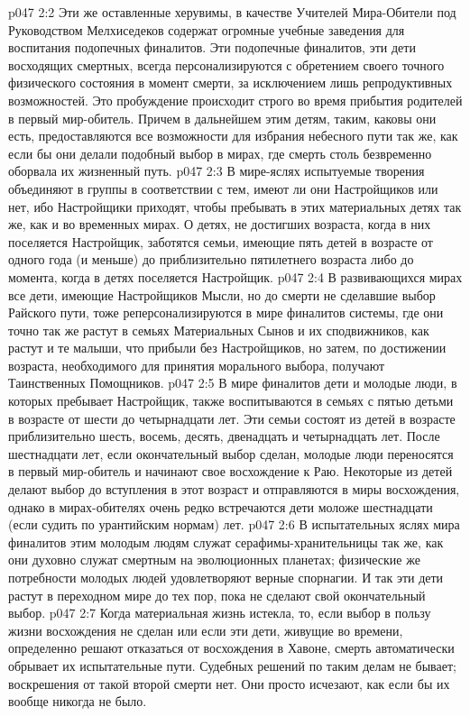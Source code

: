 \vs p047 2:2 Эти же оставленные херувимы, в качестве Учителей Мира\hyp{}Обители под Руководством Мелхиседеков содержат огромные учебные заведения для воспитания подопечных финалитов. Эти подопечные финалитов, эти дети восходящих смертных, всегда персонализируются с обретением своего точного физического состояния в момент смерти, за исключением лишь репродуктивных возможностей. Это пробуждение происходит строго во время прибытия родителей в первый мир\hyp{}обитель. Причем в дальнейшем этим детям, таким, каковы они есть, предоставляются все возможности для избрания небесного пути так же, как если бы они делали подобный выбор в мирах, где смерть столь безвременно оборвала их жизненный путь.
\vs p047 2:3 В мире\hyp{}яслях испытуемые творения объединяют в группы в соответствии с тем, имеют ли они Настройщиков или нет, ибо Настройщики приходят, чтобы пребывать в этих материальных детях так же, как и во временных мирах. О детях, не достигших возраста, когда в них поселяется Настройщик, заботятся семьи, имеющие пять детей в возрасте от одного года (и меньше) до приблизительно пятилетнего возраста либо до момента, когда в детях поселяется Настройщик.
\vs p047 2:4 В развивающихся мирах все дети, имеющие Настройщиков Мысли, но до смерти не сделавшие выбор Райского пути, тоже реперсонализируются в мире финалитов системы, где они точно так же растут в семьях Материальных Сынов и их сподвижников, как растут и те малыши, что прибыли без Настройщиков, но затем, по достижении возраста, необходимого для принятия морального выбора, получают Таинственных Помощников.
\vs p047 2:5 В мире финалитов дети и молодые люди, в которых пребывает Настройщик, также воспитываются в семьях с пятью детьми в возрасте от шести до четырнадцати лет. Эти семьи состоят из детей в возрасте приблизительно шесть, восемь, десять, двенадцать и четырнадцать лет. После шестнадцати лет, если окончательный выбор сделан, молодые люди переносятся в первый мир\hyp{}обитель и начинают свое восхождение к Раю. Некоторые из детей делают выбор до вступления в этот возраст и отправляются в миры восхождения, однако в мирах\hyp{}обителях очень редко встречаются дети моложе шестнадцати (если судить по урантийским нормам) лет.
\vs p047 2:6 В испытательных яслях мира финалитов этим молодым людям служат серафимы\hyp{}хранительницы так же, как они духовно служат смертным на эволюционных планетах; физические же потребности молодых людей удовлетворяют верные спорнагии. И так эти дети растут в переходном мире до тех пор, пока не сделают свой окончательный выбор.
\vs p047 2:7 Когда материальная жизнь истекла, то, если выбор в пользу жизни восхождения не сделан или если эти дети, живущие во времени, определенно решают отказаться от восхождения в Хавоне, смерть автоматически обрывает их испытательные пути. Судебных решений по таким делам не бывает; воскрешения от такой второй смерти нет. Они просто исчезают, как если бы их вообще никогда не было.
